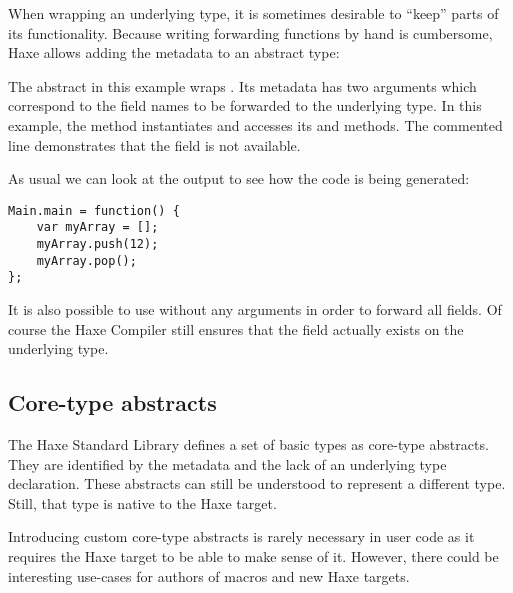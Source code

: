 When wrapping an underlying type, it is sometimes desirable to ``keep'' parts of its functionality. Because writing forwarding functions by hand is cumbersome, Haxe allows adding the  metadata to an abstract type:


The  abstract in this example wraps . Its  metadata has two arguments which correspond to the field names to be forwarded to the underlying type. In this example, the  method instantiates  and accesses its  and  methods. The commented line demonstrates that the  field is not available.

As usual we can look at the  output to see how the code is being generated:

\begin{lstlisting}
Main.main = function() {
	var myArray = [];
	myArray.push(12);
	myArray.pop();
};
\end{lstlisting}

It is also possible to use  without any arguments in order to forward all fields. Of course the Haxe Compiler still ensures that the field actually exists on the underlying type.



\subsection{Core-type abstracts}
\label{types-abstract-core-type}

The Haxe Standard Library defines a set of basic types as core-type abstracts. They are identified by the  metadata and the lack of an underlying type declaration. These abstracts can still be understood to represent a different type. Still, that type is native to the Haxe target. 

Introducing custom core-type abstracts is rarely necessary in user code as it requires the Haxe target to be able to make sense of it. However, there could be interesting use-cases for authors of macros and new Haxe targets.

